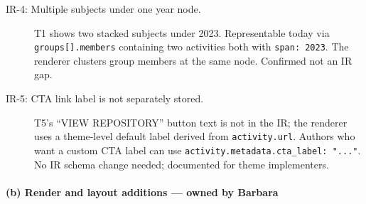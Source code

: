 \begin{description}
  \item[IR-4: Multiple subjects under one year node.]
        T1 shows two stacked subjects under 2023. Representable today via
        \texttt{groups[].members} containing two activities both with \texttt{span: 2023}.
        The renderer clusters group members at the same node. Confirmed not an IR gap.

  \item[IR-5: CTA link label is not separately stored.]
        T5's ``VIEW REPOSITORY'' button text is not in the IR; the renderer uses a
        theme-level default label derived from \texttt{activity.url}. Authors who want a
        custom CTA label can use \texttt{activity.metadata.cta\_label: "..."}. No IR
        schema change needed; documented for theme implementers.
\end{description}

\paragraph{(b) Render and layout additions --- owned by Barbara}

